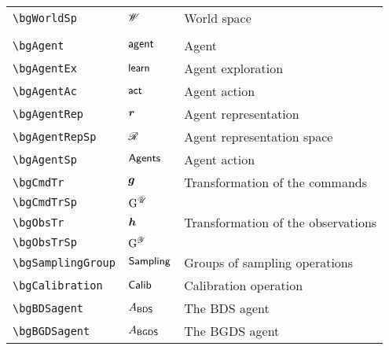 \begin{longtable}{lll}
 {\color[rgb]{0.5,0.5,0.5}\texttt{\textbackslash bgWorldSp}} & $\mathscr{W}$ &  World space\\ 
  &  & {\setlength\fboxsep{1pt}%
\fbox{%
\color[rgb]{0.5,0.5,0.5}\begin{minipage}[]{8cm}%
$\bgWorld \in \bgRSSp(\bgTime, \bgCmdSp, \bgObsSp)$\par%
{\small{\texttt{\$\textbackslash bgWorld \textbackslash in \textbackslash bgRSSp(\textbackslash bgTime, \textbackslash bgCmdSp, \textbackslash bgObsSp)\$}}}\end{minipage}%
}%
}%
\\ 
 {\color[rgb]{0.5,0.5,0.5}\texttt{\textbackslash bgAgent}} & $\mathsf{agent}$ &  Agent\\ 
 {\color[rgb]{0.5,0.5,0.5}\texttt{\textbackslash bgAgentEx}} & $\mathsf{learn}$ &  Agent exploration\\ 
 {\color[rgb]{0.5,0.5,0.5}\texttt{\textbackslash bgAgentAc}} & $\mathsf{act}$ &  Agent action\\ 
 {\color[rgb]{0.5,0.5,0.5}\texttt{\textbackslash bgAgentRep}} & $\boldsymbol{r}$ &  Agent representation\\ 
 {\color[rgb]{0.5,0.5,0.5}\texttt{\textbackslash bgAgentRepSp}} & $\mathscr{R}$ &  Agent representation space\\ 
 {\color[rgb]{0.5,0.5,0.5}\texttt{\textbackslash bgAgentSp}} & $\mathsf{Agents}$ &  Agent action\\ 
 {\color[rgb]{0.5,0.5,0.5}\texttt{\textbackslash bgCmdTr}} & $\boldsymbol{g}$ &  Transformation of the commands\\ 
 {\color[rgb]{0.5,0.5,0.5}\texttt{\textbackslash bgCmdTrSp}} & $\mathrm{G}^{\mathscr{U}}$ &  \\ 
 {\color[rgb]{0.5,0.5,0.5}\texttt{\textbackslash bgObsTr}} & $\boldsymbol{h}$ &  Transformation of the observations\\ 
 {\color[rgb]{0.5,0.5,0.5}\texttt{\textbackslash bgObsTrSp}} & $\mathrm{G}^{\mathscr{Y}}$ & \\ 
 {\color[rgb]{0.5,0.5,0.5}\texttt{\textbackslash bgSamplingGroup}} & $\mathsf{Sampling}$ &  Groups of sampling operations\\ 
 {\color[rgb]{0.5,0.5,0.5}\texttt{\textbackslash bgCalibration}} & $\mathsf{Calib}$ &  Calibration operation\\ 
 {\color[rgb]{0.5,0.5,0.5}\texttt{\textbackslash bgBDSagent}} & $A_\mathsf{BDS}$ &  The BDS agent\\ 
 {\color[rgb]{0.5,0.5,0.5}\texttt{\textbackslash bgBGDSagent}} & $A_\mathsf{BGDS}$ &  The BGDS agent\\ 

\end{longtable}
